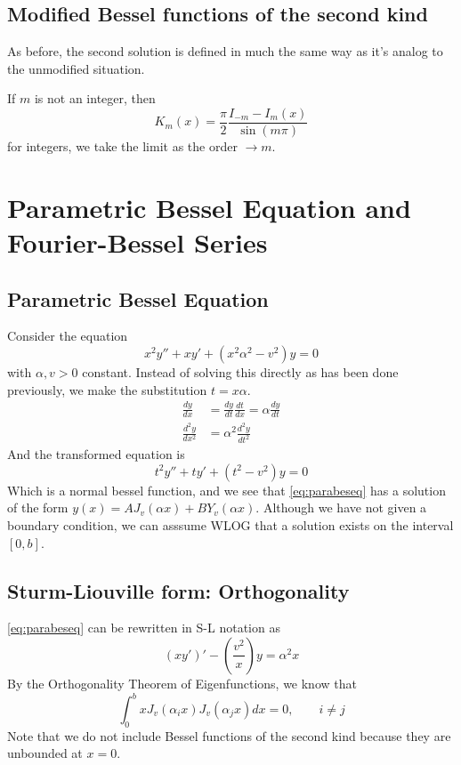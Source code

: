 \documentclass[]{article}
\begin{document}
\subsection*{Modified Bessel functions of the second kind}
As before, the second solution is defined in much the same way as it's analog to the unmodified situation. 

If $m$ is not an integer, then 
\begin{equation}
	K_m(x) = \frac{\pi}{2} \frac{I_{-m}-I_m(x)}{\sin(m\pi)}
\end{equation}
for integers, we take the limit as the order $\to m$.
\section{Parametric Bessel Equation and Fourier-Bessel Series}
\subsection{Parametric Bessel Equation}
Consider the equation 
\begin{equation} \label{eq:parabeseq}
	x^2y'' + xy' + (x^2\alpha^2-v^2)y = 0
\end{equation} 
with $\alpha,v > 0$ constant.
Instead of solving this directly as has been done previously, we make the substitution $t =  x\alpha$. 
\begin{align*}
	\frac{dy}{dx} & = \frac{d y}{dt} \frac{dt}{dx} = \alpha \frac{dy}{dt} \\
	\frac{d^2y}{dx^2} &= \alpha^2 \frac{d^2y}{dt^2}
\end{align*}
And the transformed equation is 
\begin{equation} \label{eq:parabeseqtrans}
	t^2y'' + ty' + (t^2 - v^2)y = 0
\end{equation}
Which is a normal bessel function, and we see that \eqref{eq:parabeseq} has a solution of the form $y(x) = AJ_v(\alpha x) + BY_v(\alpha x)$. Although we have not given a boundary condition, we can asssume WLOG that a solution exists on the interval $[0,b]$. 
\subsection{Sturm-Liouville form: Orthogonality}
\eqref{eq:parabeseq} can be rewritten in S-L notation as 
\begin{equation} 
	(xy')' - \left(\frac{v^2}{x} \right) y = \alpha^2x
\end{equation}
By the Orthogonality Theorem of Eigenfunctions, we know that 
\begin{equation} \label{eq:fbint}
	\int_{0}^{b} xJ_v(\alpha_ix)J_v(\alpha_jx)dx = 0, \qquad i \neq j
\end{equation}
Note that we do not include Bessel functions of the second kind because they are unbounded at $x = 0$. 
\end{document}

